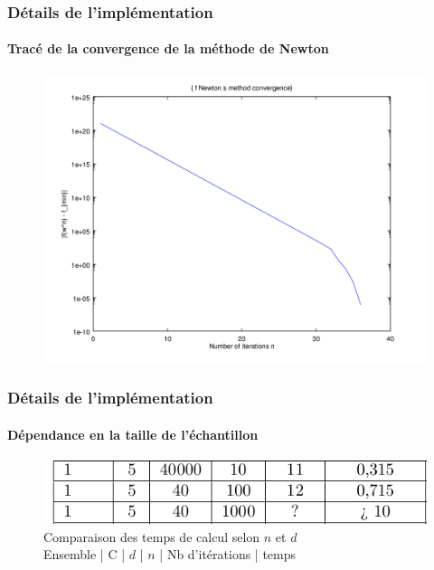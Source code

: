 \documentclass{beamer}
\begin{document}
\begin{frame}
\frametitle{Détails de l'implémentation}
\framesubtitle{Tracé de la convergence de la méthode de Newton}


         \begin{figure}
         \centering
         \includegraphics[scale=0.4]{images/cvnewton4.png}
         \end{figure}

\end{frame}

\begin{frame}
\frametitle{Détails de l'implémentation}
\framesubtitle{Dépendance en la taille de l'échantillon}


         \begin{figure}
         \centering
         \caption{Comparaison des temps de calcul selon $n$ et $d$\\
                 Ensemble | C | $d$ | $n$ | Nb d'itérations | temps}
         \includegraphics[scale=0.6]{images/tabl2.png}
         \end{figure}

\end{frame}
\end{document}

